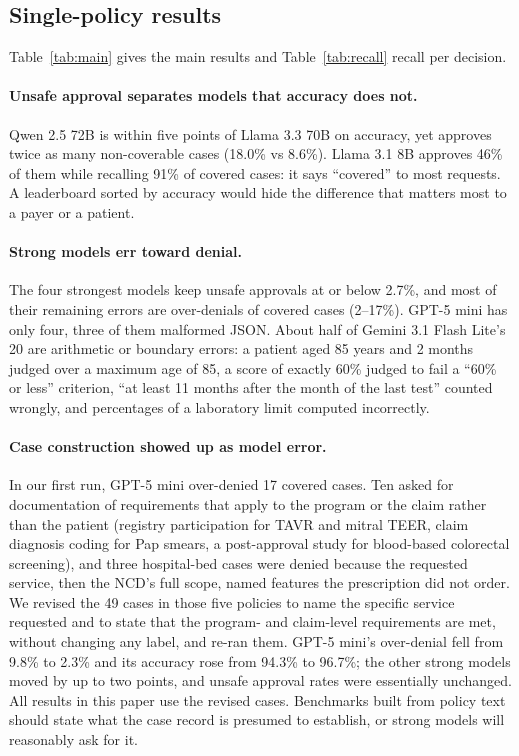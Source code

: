 \documentclass[11pt]{article}
\begin{document}
\subsection{Single-policy results}

Table~\ref{tab:main} gives the main results and Table~\ref{tab:recall} recall per decision.

\paragraph{Unsafe approval separates models that accuracy does not.} Qwen 2.5 72B is within five
points of Llama 3.3 70B on accuracy, yet approves twice as many non-coverable cases (18.0\% vs
8.6\%). Llama 3.1 8B approves 46\% of them while recalling 91\% of covered cases: it says
``covered'' to most requests. A leaderboard sorted by accuracy would hide the difference that
matters most to a payer or a patient.

\paragraph{Strong models err toward denial.} The four strongest models keep unsafe approvals at or
below 2.7\%, and most of their remaining errors are over-denials of covered cases (2--17\%). GPT-5
mini has only four, three of them malformed JSON. About half of Gemini 3.1 Flash Lite's 20 are
arithmetic or boundary errors: a patient aged 85 years and 2 months judged over a maximum age of
85, a score of exactly 60\% judged to fail a ``60\% or less'' criterion, ``at least 11 months after
the month of the last test'' counted wrongly, and percentages of a laboratory limit computed
incorrectly.

\paragraph{Case construction showed up as model error.} In our first run, GPT-5 mini over-denied
17 covered cases. Ten asked for documentation of requirements that apply to the program or the
claim rather than the patient (registry participation for TAVR and mitral TEER, claim diagnosis
coding for Pap smears, a post-approval study for blood-based colorectal screening), and three
hospital-bed cases were denied because the requested service, then the NCD's full scope, named
features the prescription did not order. We revised the 49 cases in those five policies to name
the specific service requested and to state that the program- and claim-level requirements are
met, without changing any label, and re-ran them. GPT-5 mini's over-denial fell from 9.8\% to
2.3\% and its accuracy rose from 94.3\% to 96.7\%; the other strong models moved by up to two
points, and unsafe approval rates were essentially unchanged. All results in this paper use the
revised cases. Benchmarks built from policy text should state what the case record is presumed to
establish, or strong models will reasonably ask for it.
\end{document}
